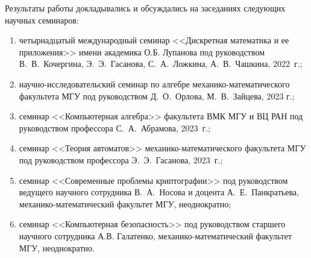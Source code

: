 Результаты работы докладывались и обсуждались на заседаниях следующих научных семинаров:
\begin{enumerate}
    \item четырнадцатый международный семинар <<Дискретная математика и ее приложения>> имени академика О.Б. Лупанова под руководством В.~В.~Кочергина, Э.~Э.~Гасанова, С.~А.~Ложкина, А.~В.~Чашкина, 2022~г.;

    \item научно-исследовательский семинар по алгебре механико-математического факультета МГУ под руководством Д.~О.~Орлова, М.~В.~Зайцева, 2023 г.;

    \item семинар <<Компьютерная алгебра>> факультета ВМК МГУ и ВЦ РАН под руководством профессора С.~А.~Абрамова, 2023~г.;

    \item семинар <<Теория автоматов>> механико-математического факультета МГУ под руководством профессора Э.~Э.~Гасанова, 2023~г.;

    \item семинар <<Современные проблемы криптографии>> под руководством ведущего научного сотрудника В.~А.~Носова и доцента А.~Е.~Панкратьева, механико-математический факультет МГУ, неоднократно;

    \item семинар <<Компьютерная безопасность>> под руководством старшего научного сотрудника А.В. Галатенко, механико-математический факультет МГУ, неоднократно.
\end{enumerate}


